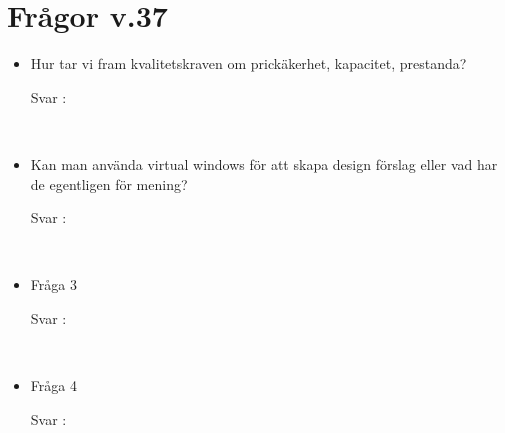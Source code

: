 \documentclass{article}
\date {#1}
\title {
    \documentTitle {Helsingborg Event and Convention Bureau}
    
    \documentDate {}
}
\begin{document}
\maketitle
\thispagestyle{empty}

\newpage




\newpage

\section{Frågor v.37}

 
\begin{itemize}
    \item Hur tar vi fram kvalitetskraven om prickäkerhet, kapacitet, prestanda?
        \begin{description}
            \item[Svar :]
        \end{description}
    \\
     \item Kan man använda virtual windows för att skapa design förslag eller vad har de egentligen för mening?
        \begin{description}
            \item[Svar :]
        \end{description}
    \\
    \item Fråga 3
        \begin{description}
            \item[Svar :]
        \end{description}  
    \\
     \item Fråga 4
        \begin{description}
            \item[Svar :]
        \end{description}
    \\
\end{itemize}
\end{document}
